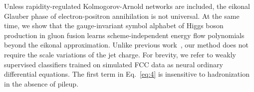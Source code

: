 Unless rapidity-regulated Kolmogorov-Arnold networks are included, the
eikonal Glauber phase of electron-positron annihilation is not
universal. At the same time, we show that the gauge-invariant symbol
alphabet of Higgs boson production in gluon fusion learns
scheme-independent energy flow polynomials beyond the eikonal
approximation. Unlike previous
work~\cite{TPC:0951-Towards-Renormalized-Simulation-Based-Inference-at-the-High-Luminosity-LHC-September-29-2026},
our method does not require the scale variations of the jet charge. For
brevity, we refer to weakly supervised classifiers trained on simulated
FCC data as neural ordinary differential equations. The first term in
Eq.~\eqref{eq:4} is insensitive to hadronization in the absence of
pileup.

